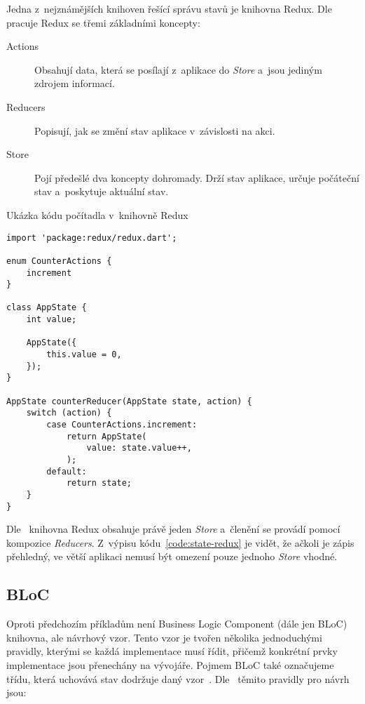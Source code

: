 Jedna z~nejznámějších knihoven řešící správu stavů je knihovna Redux.
Dle~\cite{redux_basics} pracuje Redux se třemi základními koncepty:

\begin{description}
    \item[Actions] Obsahují data,
    která se posílají z~aplikace do \emph{Store}
    a~jsou jediným zdrojem informací.
    \item[Reducers] Popisují, jak se změní stav aplikace v~závislosti na akci.
    \item[Store] Pojí předešlé dva koncepty dohromady.
    Drží stav aplikace,
    určuje počáteční stav
    a~poskytuje aktuální stav.
\end{description}

\begin{listing}
    \caption{Ukázka kódu počítadla v~knihovně Redux~\cite{redux_basics}}
    \label{code:state-redux}
    \begin{verbatim}
import 'package:redux/redux.dart';

enum CounterActions {
    increment
}

class AppState {
    int value;

    AppState({ 
        this.value = 0,
    });
}

AppState counterReducer(AppState state, action) {
    switch (action) {
        case CounterActions.increment:
            return AppState(
                value: state.value++,
            );
        default:
            return state;
    }
}
    \end{verbatim}
\end{listing}

Dle~\cite{redux_basics} knihovna Redux obsahuje právě jeden \emph{Store}
a~členění se provádí pomocí kompozice \emph{Reducers}.
Z~výpisu kódu~\ref{code:state-redux} je vidět,
že ačkoli je zápis přehledný,
ve větší aplikaci nemusí být omezení pouze jednoho \emph{Store} vhodné.

\subsection{BLoC}

Oproti předchozím příkladům není Business Logic Component (dále jen BLoC)
knihovna,
ale návrhový vzor.
Tento vzor je tvořen několika jednoduchými pravidly,
kterými se každá implementace musí řídit,
přičemž konkrétní prvky implementace jsou přenechány na
vývojáře.
Pojmem BLoC také označujeme třídu,
která uchovává stav dodržuje daný vzor~\cite{googledevelopers_bloc}. 
Dle~\cite{googledevelopers_bloc} těmito pravidly pro návrh jsou:

